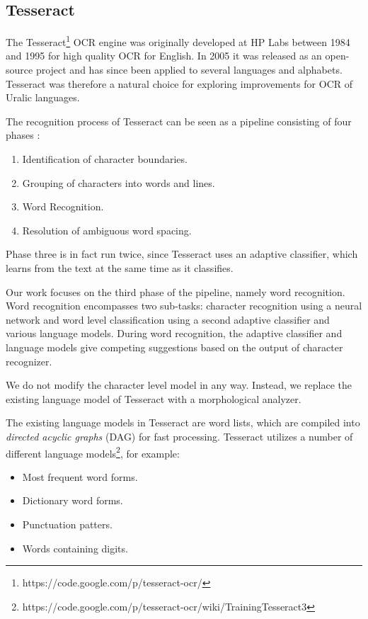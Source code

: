 \documentclass[b5paper]{article}
\begin{document}
\subsection{Tesseract}
The Tesseract\footnote{https://code.google.com/p/tesseract-ocr/} OCR
engine \cite{smith07} was originally developed at HP Labs between 1984
and 1995 for high quality OCR for English. In 2005 it was released as
an open-source project and has since been applied to several languages
and alphabets. Tesseract was therefore a natural choice for exploring
improvements for OCR of Uralic languages.

The recognition process of Tesseract can be seen as a pipeline
consisting of four phases \cite{smith07}:
\begin{enumerate}
\item Identification of character boundaries.
\item Grouping of characters into words and lines.
\item Word Recognition.
\item Resolution of ambiguous word spacing.
\end{enumerate}
Phase three is in fact run twice, since Tesseract uses an adaptive
classifier, which learns from the text at the same time as it
classifies.

Our work focuses on the third phase of the pipeline, namely word
recognition. Word recognition encompasses two sub-tasks: character
recognition using a neural network and word level classification using
a second adaptive classifier and various language models. During word
recognition, the adaptive classifier and language models give
competing suggestions based on the output of character recognizer.

We do not modify the character level model in any way. Instead, we
replace the existing language model of Tesseract with a morphological
analyzer.

The existing language models in Tesseract are word lists, which are
compiled into {\it directed acyclic graphs} (DAG) for fast
processing. Tesseract utilizes a number of different language
models\footnote{https://code.google.com/p/tesseract-ocr/wiki/TrainingTesseract3},
for example:
\begin{itemize}
\item Most frequent word forms.
\item Dictionary word forms.
\item Punctuation patters.
\item Words containing digits.
\end{itemize}
\end{document}
